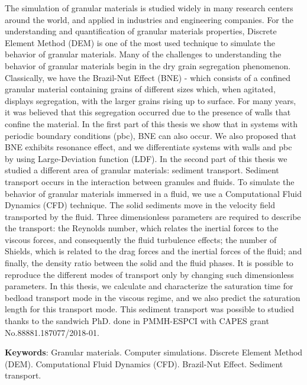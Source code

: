 
\begin{resumo}[Abstract]
    The simulation of granular materials is studied widely in many research centers around the world, and applied in industries and engineering companies. For the understanding and quantification of granular materials properties, Discrete Element Method (DEM) is one of the most used technique to simulate the behavior of granular materials.
    Many of the challenges to understanding the behavior of granular materials begin in the dry grain segregation phenomenon. Classically, we have the Brazil-Nut Effect (BNE) - which consists of a confined granular material containing grains of different sizes which, when agitated, displays segregation, with the larger grains rising up to surface. For many years, it was believed that this segregation occurred due to the presence of walls that confine the material. In the first part of this thesis we show that in systems with periodic boundary conditions (pbc), BNE can also occur. We also proposed that BNE exhibits resonance effect, and we differentiate systems with walls and pbc by using Large-Deviation function (LDF).
    In the second part of this thesis we studied a different area of granular materials: sediment transport. Sediment transport occurs in the interaction between granules and fluids. To simulate the behavior of granular materials immersed in a fluid, we use a Computational Fluid Dynamics (CFD) technique. The solid sediments move in the velocity field transported by the fluid. Three dimensionless parameters are required to describe the transport: the Reynolds number, which relates the inertial forces to the viscous forces, and consequently the fluid turbulence effects; the number of Shields, which is related to the drag forces and the inertial forces of the fluid; and finally, the density ratio between the solid and the fluid phases. It is possible to reproduce the different modes of transport only by changing such dimensionless parameters. In this thesis, we calculate and characterize the saturation time for bedload transport mode in the viscous regime, and we also predict the saturation length for this transport mode. This sediment transport was possible to studied thanks to the sandwich PhD. done in PMMH-ESPCI with CAPES grant No.88881.187077/2018-01.

    \textbf{Keywords}: Granular materials. Computer simulations. Discrete Element Method (DEM). Computational Fluid Dynamics (CFD). Brazil-Nut Effect. Sediment transport.
\end{resumo}
